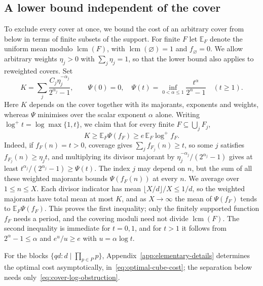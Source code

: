 \documentclass[11pt]{article}
\begin{document}
\subsection{A lower bound independent of the cover}
To exclude every cover at once, we bound the cost of an arbitrary cover
from below in terms of finite subsets of the support. For finite $F$
let $\mathbb E_F$ denote the uniform mean modulo
$\operatorname{lcm}(F)$, with $\operatorname{lcm}(\varnothing)=1$ and
$f_{\varnothing}=0$. We allow arbitrary weights $\eta_j>0$ with
$\sum_j\eta_j=1$, so that the lower bound also applies to reweighted
covers. Set
\[
 K=\sum_j\frac{C_j\eta_j^{-\alpha_j}}{2^{\alpha_j}-1},\qquad
 \Psi(0)=0,\quad
 \Psi(t)=\inf_{0<\alpha\le1}\frac{t^\alpha}{2^\alpha-1}\quad(t\ge1).
\]
Here $K$ depends on the cover together with its majorants, exponents
and weights, whereas $\Psi$ minimises over the scalar exponent $\alpha$
alone. Writing $\log^+t=\log\max\{1,t\}$, we claim that for every
finite $F\subseteq\bigcup_jF_j$,
\begin{equation}
 K\ge\mathbb E_F\Psi(f_F)\ge e\,\mathbb E_F\log^+f_F.
 \label{eq:cover-log-obstruction}
\end{equation}
Indeed, if $f_F(n)=t>0$, coverage gives $\sum_jf_{F_j}(n)\ge t$, so
some $j$ satisfies $f_{F_j}(n)\ge\eta_jt$, and multiplying its divisor
majorant by $\eta_j^{-\alpha_j}/(2^{\alpha_j}-1)$ gives at least
$t^{\alpha_j}/(2^{\alpha_j}-1)\ge\Psi(t)$. The index $j$ may depend on
$n$, but the sum of all these weighted majorants bounds
$\Psi(f_F(n))$ at every $n$. We average over $1\le n\le X$. Each
divisor indicator has mean $\lfloor X/d\rfloor/X\le1/d$, so the
weighted majorants have total mean at most $K$, and as $X\to\infty$
the mean of $\Psi(f_F)$ tends to $\mathbb E_F\Psi(f_F)$. This proves
the first inequality; only the finitely supported function $f_F$ needs
a period, and the covering moduli need not divide
$\operatorname{lcm}(F)$. The second inequality is immediate for
$t=0,1$, and for $t>1$ it follows from $2^\alpha-1\le\alpha$ and
$e^u/u\ge e$ with $u=\alpha\log t$.

For the blocks $\{qd:d\mid\prod_{p\in P}p\}$,
Appendix~\ref{app:elementary-details} determines the optimal cost
asymptotically, in~\eqref{eq:optimal-cube-cost}; the
separation below needs only~\eqref{eq:cover-log-obstruction}.
\end{document}
